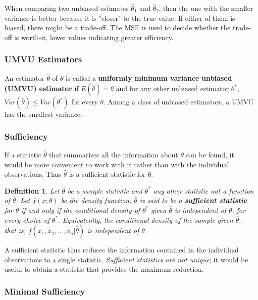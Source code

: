 \documentclass{article}
\newtheorem{definition}{Definition}[section]
\begin{document}
When comparing two unbiased estimates \(\hat{\theta}_1\) and \(\hat{\theta}_2\), then the one with the smaller variance is better because it is "closer" to the true value. If either of them is biased, there might be a trade-off. The MSE is used to decide whether the trade-off is worth-it, lower values indicating greater efficiency.

\subsubsection{UMVU Estimators}

An estimator \(\hat{\theta}\) of \(\theta\) is called a \textbf{uniformly minimum variance unbiased (UMVU) estimator} if \(E(\hat{\theta})=\theta\) and for any other unbiased estimator \(\theta^*\), \(Var(\hat{\theta}) \leq Var(\theta^*)\) for every \(\theta\). Among a class of unbiased estimators, a UMVU has the smallest variance.

\subsubsection{Sufficiency}

If a statistic \(\hat{\theta}\) that summarizes all the information about \(\theta\) can be found, it would be more convenient to work with it rather than with the individual observations. Thus \(\hat{\theta}\) is a sufficient statistic for \(\theta\).

\begin{definition}
    Let \(\hat{\theta}\) be a sample statistic and \(\theta^*\) any other statistic not a function of \(\hat{\theta}\). Let \(f(x;\theta)\) be the density function. \(\hat{\theta}\) is said to be a \textbf{sufficient statistic} for \(\theta\) if and only if the conditional density of \(\theta^*\) given \(\hat{\theta}\) is independent of \(\theta\), for every choice of \(\theta^*\). Equivalently, the conditional density of the sample given \(\hat{\theta}\), that is, \(f(x_1,x_2,\dots,x_n|\hat{\theta})\) is independent of \(\theta\).
\end{definition}

A sufficient statistic thus reduces the information contained in the individual observations to a single statistic. \textit{Sufficient statistics are not unique}; it would be useful to obtain a statistic that provides the maximum reduction.

\subsubsection{Minimal Sufficiency}
\end{document}
